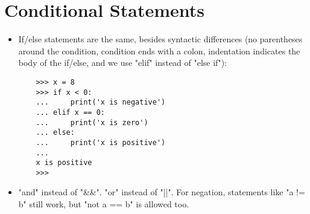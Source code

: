 \documentclass{article}
\begin{document}
\section{Conditional Statements}
\begin{itemize}
    \item If/else statements are the same, besides syntactic differences (no parentheses around the condition, condition ends with a colon, indentation indicates the body of the if/else, and we use "elif" instead of "else if"):
    \begin{lstlisting}
    >>> x = 8
    >>> if x < 0:
    ...     print('x is negative')
    ... elif x == 0:
    ...     print('x is zero')
    ... else:
    ...     print('x is positive')
    ... 
    x is positive
    >>> 
    \end{lstlisting}
    \item "and" instead of "&&". "or" instead of "||". For negation, statements like "a != b" still work, but "not a == b" is allowed too.
\end{itemize}
\end{document}
